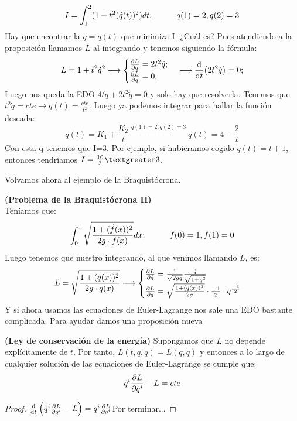 \documentclass[palatino, bibnumbers]{apuntes}
\begin{document}
\begin{example}$$I=\int_{1}^{2}(1+t^2(\dot{q}(t))^2)dt;\hspace*{1cm} q(1)=2, q(2)=3$$
	Hay que encontrar la $q=q(t)$ que minimiza I. ¿Cuál es? Pues atendiendo a la proposición llamamos $L$ al integrando y tenemos siguiendo la fórmula: $$L=1+t^2\dot{q}^2\longrightarrow\begin{cases}
	\pdv{L}{\dot{q}}=2t^2\dot{q};\\
	\pdv{L}{q}=0;
	\end{cases}\longrightarrow\dv{t}(2t^2\dot{q})=0;$$
	Luego nos queda la EDO $4t\dot{q}+2t^2\ddot{q}=0$ y solo hay que resolverla. Tenemos que $t^2\dot{q}=cte\rightarrow \dot{q}(t)=\frac{cte}{t^2}$. Luego ya podemos integrar para hallar la función deseada: $$q(t)=K_1+\frac{K_2}{t}\xrightarrow{q(1)=2, q(2)=3}q(t)=4-\frac{2}{t}$$
Con esta q tenemos que I=3. Por ejemplo, si hubieramos cogido $q(t)=t+1$, entonces tendríamos $I=\frac{10}{3}\textgreater3$.\\
\end{example}
Volvamos ahora al ejemplo de la Braquistócrona.
\begin{example}\textbf{(Problema de la Braquistócrona II)}\\
Teníamos que:
$$\int_{0}^{1}\sqrt{\frac{1+(\dot{f}(x))^2}{2g\cdot f(x)}}dx;\hspace*{1cm} f(0)=1,f(1)=0$$ 
\newpage
Luego tenemos que nuestro integrando, al que venimos llamando $L$, es:
$$L=\sqrt{\frac{1+(\dot{q}(x))^2}{2g\cdot q(x)}}\longrightarrow\begin{cases}\pdv{L}{\dot{q}}=\frac{1}{\sqrt{2gq}}\frac{\dot{q}}{\sqrt{1+\dot{q}^2}}\\
\pdv{L}{q}=\sqrt{\frac{1+(\dot{q}(x))^2}{2g}}\cdot\frac{-1}{2}\cdot q^{\frac{-3}{2}}
\end{cases}$$
Y si ahora usamos las ecuaciones de Euler-Lagrange nos sale una EDO bastante complicada. Para ayudar damos una proposición nueva
\end{example}
\begin{prop}\textbf{(Ley de conservación de la energía)} Supongamos que $L$ no depende explícitamente de $t$. Por tanto, $L(t,q,\dot{q})=L(q,\dot{q})$ y entonces a lo largo de cualquier solución de las ecuaciones de Euler-Lagrange se cumple que:
\begin{equation}
\dot{q}^i\pdv{L}{\dot{q}^i}-L=cte
\end{equation}
\end{prop}
\begin{proof}
	$\dv{t}\left(\dot{q}^i\pdv{L}{\dot{q}^i}-L\right)=\ddot{q}^i\pdv{L}{\dot{q}^i}$Por terminar...
\end{proof}
\end{document}
